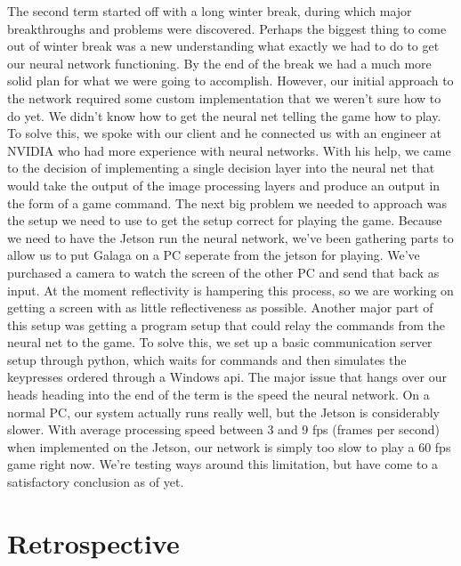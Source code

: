 \documentclass[onecolumn, draftclsnofoot,10pt, compsoc]{IEEEtran}
\begin{document}
\newline\newline
The second term started off with a long winter break, during which major breakthroughs and problems were discovered.
Perhaps the biggest thing to come out of winter break was a new understanding what exactly we had to do to get our neural network functioning.
By the end of the break we had a much more solid plan for what we were going to accomplish.
However, our initial approach to the network required some custom implementation that we weren't sure how to do yet.
We didn't know how to get the neural net telling the game how to play.
To solve this, we spoke with our client and he connected us with an engineer at NVIDIA who had more experience with neural networks.
With his help, we came to the decision of implementing a single decision layer into the neural net that would take the output of the image processing layers and produce an output in the form of a game command.
\newline\newline
The next big problem we needed to approach was the setup we need to use to get the setup correct for playing the game.
Because we need to have the Jetson run the neural network, we've been gathering parts to allow us to put Galaga on a PC seperate from the jetson for playing.
We've purchased a camera to watch the screen of the other PC and send that back as input.
At the moment reflectivity is hampering this process, so we are working on getting a screen with as little reflectiveness as possible.
Another major part of this setup was getting a program setup that could relay the commands from the neural net to the game.
To solve this, we set up a basic communication server setup through python, which waits for commands and then simulates the keypresses ordered through a Windows api.
\newline\newline
The major issue that hangs over our heads heading into the end of the term is the speed the neural network.
On a normal PC, our system actually runs really well, but the Jetson is considerably slower.
With average processing speed between 3 and 9 fps (frames per second) when implemented on the Jetson, our network is simply too slow to play a 60 fps game right now.
We're testing ways around this limitation, but have come to a satisfactory conclusion as of yet.

\section{Retrospective}
\end{document}

